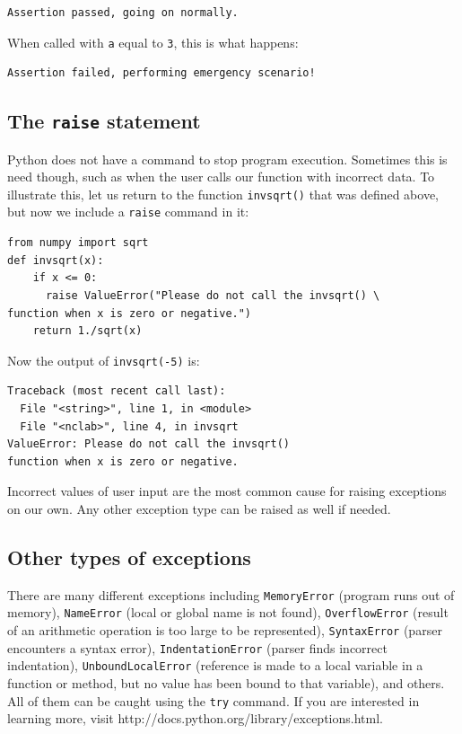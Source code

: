 \begin{verbatim}
Assertion passed, going on normally.
\end{verbatim}
When called with {\tt a} equal to {\tt 3}, this is what happens:

\begin{verbatim}
Assertion failed, performing emergency scenario!
\end{verbatim}

\subsection{The {\tt raise} statement}

Python does not have a command to stop program execution. Sometimes this is
need though, such as when the user calls our function with incorrect data. 
To illustrate this, let us return to the function {\tt invsqrt()} that was 
defined above, but now we include a {\tt raise} command in it:
 
\begin{verbatim}
from numpy import sqrt
def invsqrt(x):
    if x <= 0:
      raise ValueError("Please do not call the invsqrt() \
function when x is zero or negative.")
    return 1./sqrt(x)
\end{verbatim}
Now the output of {\tt invsqrt(-5)} is:

\begin{verbatim}
Traceback (most recent call last):
  File "<string>", line 1, in <module>
  File "<nclab>", line 4, in invsqrt
ValueError: Please do not call the invsqrt() 
function when x is zero or negative.
\end{verbatim}
Incorrect values of user input are the most common cause for raising 
exceptions on our own. Any other exception type can be raised as well
if needed.

\subsection{Other types of exceptions}

There are many different exceptions including {\tt MemoryError} (program runs out of memory),
{\tt NameError} (local or global name is not found), {\tt OverflowError} (result of an arithmetic 
operation is too large to be represented), {\tt SyntaxError} (parser encounters a syntax error),
{\tt IndentationError} (parser finds incorrect indentation), {\tt UnboundLocalError} (reference 
is made to a local variable in a function or method, but no value has been bound to that variable),
and others. All of them can be caught using the {\tt try} command. If you are interested in 
learning more, visit http://docs.python.org/library/exceptions.html.

